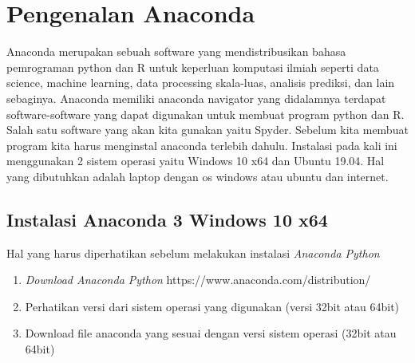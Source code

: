 \section{Pengenalan Anaconda}
Anaconda merupakan sebuah software yang mendistribusikan bahasa pemrograman python dan R untuk keperluan komputasi ilmiah seperti data science, machine learning, data processing skala-luas, analisis prediksi, dan lain sebaginya.
Anaconda memiliki anaconda navigator yang didalamnya terdapat software-software yang dapat digunakan untuk membuat program python dan R. Salah satu software yang akan kita gunakan yaitu Spyder. Sebelum kita membuat program kita harus menginstal anaconda terlebih dahulu.
Instalasi pada kali ini menggunakan 2 sistem operasi yaitu Windows 10 x64 dan Ubuntu 19.04. Hal yang dibutuhkan adalah laptop dengan os windows atau ubuntu dan internet.
\subsection{Instalasi Anaconda 3 Windows 10 x64}
Hal yang harus diperhatikan sebelum melakukan instalasi \textit{Anaconda Python}
\begin{enumerate}
 \item \textit{Download Anaconda Python} https://www.anaconda.com/distribution/
 \item Perhatikan versi dari sistem operasi yang digunakan (versi 32bit atau 64bit)
 \item Download file anaconda yang sesuai dengan versi sistem operasi (32bit atau 64bit)
\end{enumerate}

